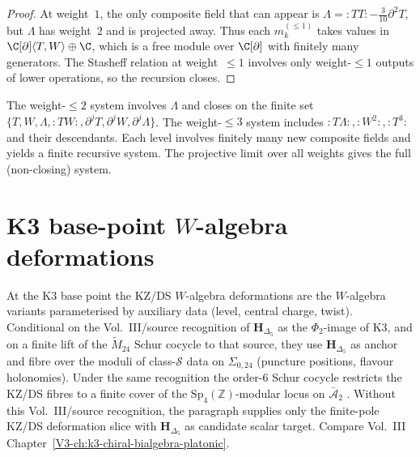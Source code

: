 \begin{proof}
At weight~$1$, the only composite field that can appear is $\Lambda =
{:}TT{:} - \tfrac{3}{10}\partial^2 T$, but $\Lambda$ has weight~$2$
and is projected away. Thus each $m_k^{(\le 1)}$ takes values in
$\C[\partial]\langle T, W \rangle \oplus \C$, which is a free module
over $\C[\partial]$ with finitely many generators. The Stasheff
relation at weight~$\le 1$ involves only weight-$\le 1$ outputs of
lower operations, so the recursion closes.
\end{proof}

\begin{remark}
\label{rem:weight-filtration-inductive}
The weight-$\le 2$ system involves $\Lambda$ and closes on the finite set
$\{T, W, \Lambda, :TW:, \partial^j T, \partial^j W, \partial^j \Lambda\}$.
The weight-$\le 3$ system includes
$:T\Lambda:, :W^2:, :T^3:$ and their descendants. Each level involves
finitely many new composite fields and yields a finite recursive system.
The projective limit over all weights gives the full (non-closing) system.
\end{remark}

\section{K3 base-point $W$-algebra deformations}
\label{sec:wac-supplement}

\begin{remark}
\label{rem:wac-1}
At the K3 base point the KZ/DS $W$-algebra deformations are the
$W$-algebra variants parameterised by auxiliary data (level, central
charge, twist). Conditional on the Vol.~III/source recognition of
$\mathbf H_{\Delta_5}$ as the $\Phi_2$-image of K3, and on a finite
lift of the $\widetilde M_{24}$ Schur cocycle to that source, they use
$\mathbf H_{\Delta_5}$ as anchor and fibre over the moduli of
class-$\mathcal S$ data on $\Sigma_{0,24}$ (puncture positions,
flavour holonomies). Under the same recognition the order-$6$ Schur
cocycle restricts the KZ/DS fibres to a finite cover of the
$\mathrm{Sp}_4(\mathbb Z)$-modular locus on $\bar{\mathcal A}_2$
\cite{ChengDuncanHarvey2014,Gaiotto2009}. Without this Vol.~III/source
recognition, the paragraph supplies only the finite-pole KZ/DS
deformation slice with $\mathbf H_{\Delta_5}$ as candidate scalar
target. Compare Vol.~III Chapter~\ref{V3-ch:k3-chiral-bialgebra-platonic}.
\end{remark}

